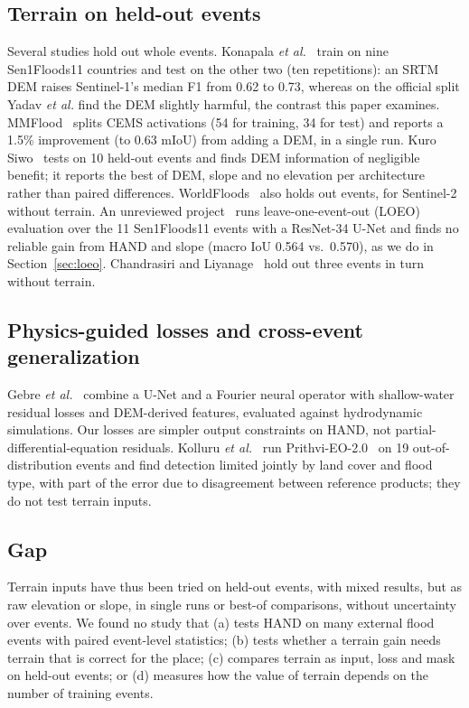 \subsection{Terrain on held-out events}
Several studies hold out whole events. Konapala \emph{et al.}~\cite{konapala2021exploring} train on nine
Sen1Floods11 countries and test on the other two (ten repetitions): an SRTM DEM raises Sentinel-1's median F1
from 0.62 to 0.73, whereas on the official split Yadav \emph{et al.} find the DEM slightly harmful, the contrast
this paper examines. MMFlood~\cite{montello2022mmflood} splits CEMS activations (54 for training, 34 for test)
and reports a 1.5\% improvement (to 0.63 mIoU) from adding a DEM, in a single run. Kuro Siwo~\cite{bountos2024kurosiwo} tests on 10 held-out
events and finds DEM information of negligible benefit; it reports the best of DEM, slope and no elevation per
architecture rather than paired differences. WorldFloods~\cite{mateogarcia2021worldfloods} also holds out
events, for Sentinel-2 without terrain. An unreviewed project~\cite{pranav2026loeo} runs leave-one-event-out
(LOEO) evaluation over the 11 Sen1Floods11 events with a ResNet-34 U-Net and finds no reliable gain from HAND
and slope (macro IoU 0.564 vs.\ 0.570), as we do in Section~\ref{sec:loeo}. Chandrasiri and
Liyanage~\cite{chandrasiri2026} hold out three events in turn without terrain.

\subsection{Physics-guided losses and cross-event generalization}
Gebre \emph{et al.}~\cite{gebre2026physics} combine a U-Net and a Fourier neural operator with
shallow-water residual losses and DEM-derived features, evaluated against hydrodynamic simulations. Our
losses are simpler output constraints on HAND, not partial-differential-equation residuals.
Kolluru \emph{et al.}~\cite{kolluru2026landcover} run Prithvi-EO-2.0~\cite{szwarcman2024prithvi} on 19
out-of-distribution events and find detection limited jointly by land cover and flood type, with part of
the error due to disagreement between reference products; they do not test terrain inputs.

\subsection{Gap}
Terrain inputs have thus been tried on held-out events, with mixed results, but as raw elevation or slope, in
single runs or best-of comparisons, without uncertainty over events. We found no study that (a) tests HAND on
many external flood events with paired event-level statistics; (b) tests whether a terrain gain needs terrain
that is correct for the place; (c) compares terrain as input, loss and mask on held-out events; or (d)
measures how the value of terrain depends on the number of training events.
